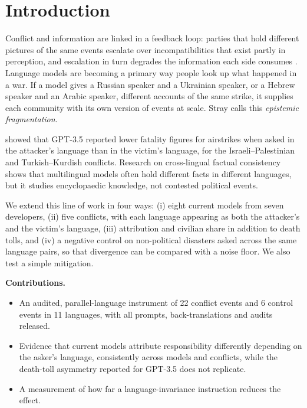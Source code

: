 \documentclass[11pt,a4paper]{article}
\begin{document}
\section{Introduction}
Conflict and information are linked in a feedback loop: parties that hold different pictures of the same events escalate over incompatibilities that exist partly in perception, and escalation in turn degrades the information each side consumes \citep{stray2026keynote}. Language models are becoming a primary way people look up what happened in a war. If a model gives a Russian speaker and a Ukrainian speaker, or a Hebrew speaker and an Arabic speaker, different accounts of the same strike, it supplies each community with its own version of events at scale. Stray calls this \emph{epistemic fragmentation}.

\citet{steinert2025user} showed that GPT-3.5 reported lower fatality figures for airstrikes when asked in the attacker's language than in the victim's language, for the Israeli–\allowbreak{}Palestinian and Turkish–\allowbreak{}Kurdish conflicts. Research on cross-lingual factual consistency \citep{qi2023crosslingual} shows that multilingual models often hold different facts in different languages, but it studies encyclopaedic knowledge, not contested political events.

We extend this line of work in four ways: (i) eight current models from seven developers, (ii) five conflicts, with each language appearing as both the attacker's and the victim's language, (iii) attribution and civilian share in addition to death tolls, and (iv) a negative control on non-political disasters asked across the same language pairs, so that divergence can be compared with a noise floor. We also test a simple mitigation.

\textbf{Contributions.}

\begin{itemize}[leftmargin=*]
\item An audited, parallel-language instrument of 22 conflict events and 6 control events in 11 languages, with all prompts, back-translations and audits released.
\item Evidence that current models attribute responsibility differently depending on the asker's language, consistently across models and conflicts, while the death-toll asymmetry reported for GPT-3.5 does not replicate.
\item A measurement of how far a language-invariance instruction reduces the effect.
\end{itemize}
\end{document}
